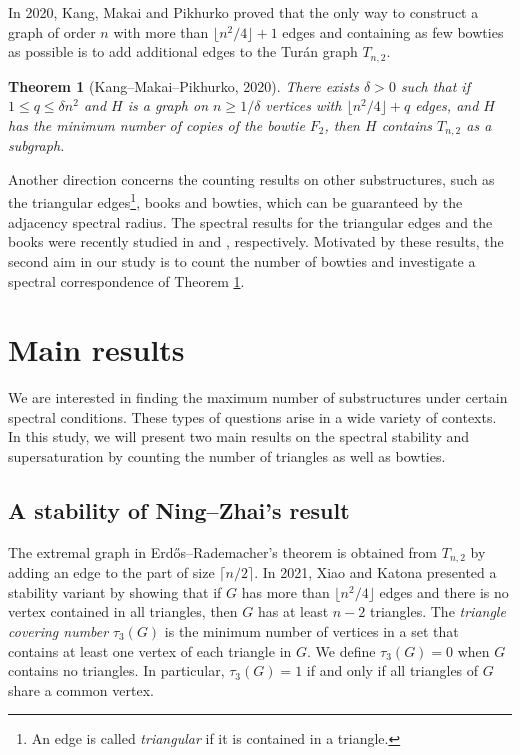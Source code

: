 \documentclass[11pt]{article}
\newtheorem{theorem}{Theorem}[section]
\begin{document}
  
In 2020, Kang, Makai and Pikhurko \cite{KMP2020} 
proved that the only way to construct a graph of order $n$ with more than $\lfloor n^2/4\rfloor +1$ edges and containing as few bowties as possible is to add additional edges to the Tur\'{a}n graph $T_{n,2}$.   

\begin{theorem}[Kang--Makai--Pikhurko, 2020] \label{thm-KMP}
There exists $\delta >0$ such that 
if $1\le q\le \delta n^2$ and 
$H$ is a graph on $n\ge 1/ \delta$ vertices with 
$ \lfloor n^2/4 \rfloor+ q$ edges, 
and $H$ has the minimum number of copies of the bowtie $F_2$, 
then $H$ contains $T_{n,2}$ as a subgraph. 
\end{theorem}


Another direction concerns the counting results on other substructures,  
such as the triangular edges\footnote{An edge is called {\it triangular} if it is contained in a triangle.}, books and bowties, which 
can be guaranteed by the adjacency spectral radius.  
The spectral results for the triangular edges and the books were recently studied in \cite{LFP2024-triangular} and \cite{ZL2022jgt}, respectively.  
Motivated by these results, the second aim in our study is to 
count the number of bowties and 
investigate a spectral correspondence of Theorem \ref{thm-KMP}. 




\section{Main results}

We are interested in finding 
the maximum number of substructures under certain spectral conditions. 
These types of questions arise in a wide variety of contexts. 
In this study, we will present two main results on 
the spectral stability and supersaturation 
by counting the number of triangles as well as bowties.  







\subsection{A stability of Ning--Zhai's result}
\label{sec1.1}

The extremal graph in Erd\H{o}s--Rademacher's theorem 
is obtained from $T_{n,2}$ by adding an edge to the part of size $\lceil n/2\rceil$. 
In 2021, 
Xiao and Katona \cite{XK2021} 
presented a stability variant 
 by showing that 
if $G$ has more than $ \lfloor {n^2}/{4}  \rfloor  $ edges 
and there is no vertex contained in all triangles,  
then $G$ has at least $n-2$ triangles. 
The {\it triangle covering number} $\tau_3(G)$ is the minimum number of vertices in a set that contains at least one vertex of each triangle in $G$.  
We define $\tau_3(G)=0$ when $G$ contains no triangles.   
In particular,  $\tau_3(G)=1$ if and only if all triangles of $G$ share a common vertex. 
\end{document}
